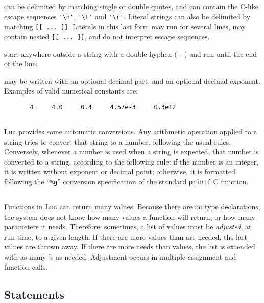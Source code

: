  can be delimited by matching single or double quotes,
and can contain the C-like escape sequences
\verb-'\n'-, \verb-'\t'- and \verb-'\r'-.
Literal strings can also be delimited by matching \verb'[[ ... ]]'.
Literals in this last form may run for several lines,
may contain nested \verb'[[ ... ]]',
and do not interpret escape sequences.

 start anywhere outside a string with a
double hyphen (\verb'--') and run until the end of the line.

 may be written with an optional decimal part,
and an optional decimal exponent.
Examples of valid numerical constants are:
\begin{verbatim}
       4     4.0     0.4     4.57e-3     0.3e12
\end{verbatim}


\subsection{} \label{coercion}

Lua provides some automatic conversions.
Any arithmetic operation applied to a string tries to convert
that string to a number, following the usual rules.
Conversely, whenever a number is used when a string is expected,
that number is converted to a string, according to the following rule:
if the number is an integer, it is written without exponent or decimal point;
otherwise, it is formatted following the ``\verb'%g'''
conversion specification of the standard \verb'printf' C function.



\subsection{} \label{adjust}

Functions in Lua can return many values.
Because there are no type declarations,
the system does not know how many values a function will return,
or how many parameters it needs.
Therefore, sometimes, a list of values must be {\em adjusted\/}, at run time,
to a given length.
If there are more values than are needed, the last values are thrown away.
If there are more needs than values, the list is extended with as
many  \nil's as needed.
Adjustment occurs in multiple assignment and function calls.


\subsection{Statements}

